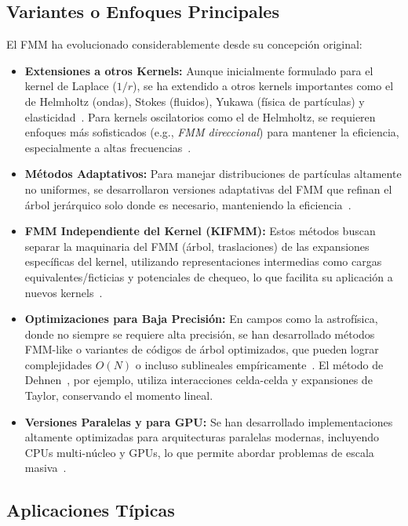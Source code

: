 \subsection{Variantes o Enfoques Principales}

El FMM ha evolucionado considerablemente desde su concepción original:
\begin{itemize}
    \item \textbf{Extensiones a otros Kernels:} Aunque inicialmente formulado para el kernel de Laplace ($1/r$), se ha extendido a otros kernels importantes como el de Helmholtz (ondas), Stokes (fluidos), Yukawa (física de partículas) y elasticidad~\cite{ChengEtAl1999, Martinsson2012, Rokhlin1990}. Para kernels oscilatorios como el de Helmholtz, se requieren enfoques más sofisticados (e.g., \textit{FMM direccional}) para mantener la eficiencia, especialmente a altas frecuencias~\cite{EngquistYing2009, Rokhlin1990}.
    \item \textbf{Métodos Adaptativos:} Para manejar distribuciones de partículas altamente no uniformes, se desarrollaron versiones adaptativas del FMM que refinan el árbol jerárquico solo donde es necesario, manteniendo la eficiencia~\cite{CarrierEtAl1988, ChengEtAl1999}.
    \item \textbf{FMM Independiente del Kernel (KIFMM):} Estos métodos buscan separar la maquinaria del FMM (árbol, traslaciones) de las expansiones específicas del kernel, utilizando representaciones intermedias como cargas equivalentes/ficticias y potenciales de chequeo, lo que facilita su aplicación a nuevos kernels~\cite{YingEtAl2004, Martinsson2012}.
    \item \textbf{Optimizaciones para Baja Precisión:} En campos como la astrofísica, donde no siempre se requiere alta precisión, se han desarrollado métodos FMM-like o variantes de códigos de árbol optimizados, que pueden lograr complejidades $O(N)$ o incluso sublineales empíricamente~\cite{Dehnen2002}. El método de Dehnen~\cite{Dehnen2002}, por ejemplo, utiliza interacciones celda-celda y expansiones de Taylor, conservando el momento lineal.
    \item \textbf{Versiones Paralelas y para GPU:} Se han desarrollado implementaciones altamente optimizadas para arquitecturas paralelas modernas, incluyendo CPUs multi-núcleo y GPUs, lo que permite abordar problemas de escala masiva~\cite{YokotaBarba2012, Martinsson2012}.
\end{itemize}

\subsection{Aplicaciones Típicas}

